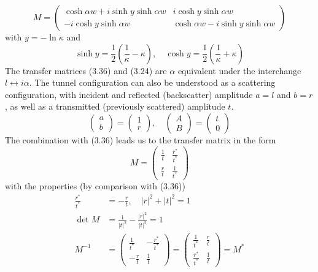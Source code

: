 \begin{equation}
M=\left(\begin{array}{cc}{\cosh \alpha w+i \sinh y \sinh \alpha w} & {i \cosh y \sinh \alpha w} \\ {-i \cosh y \sinh \alpha w} & {\cosh \alpha w-i \sinh y \sinh \alpha w}\end{array}\right)
\end{equation}
with $y = - \operatorname{ln} \kappa$ and
\begin{equation}
\sinh y=\frac{1}{2}\left(\frac{1}{\kappa}-\kappa\right), \quad \cosh y=\frac{1}{2}\left(\frac{1}{\kappa}+\kappa\right)
\end{equation}
The transfer matrices (3.36) and (3.24) are $\alpha$ equivalent under the interchange $l\longleftrightarrow i\alpha$. The tunnel configuration can also be understood as a scattering configuration, with incident and reflected (backscatter) amplitude $a = l$ and $b = r$, as well as a transmitted (previously scattered) amplitude $t$.
\begin{equation}
\left(\begin{array}{l}{a} \\ {b}\end{array}\right)=\left(\begin{array}{l}{1} \\ {r}\end{array}\right), \quad\left(\begin{array}{l}{A} \\ {B}\end{array}\right)=\left(\begin{array}{l}{t} \\ {0}\end{array}\right)
\end{equation}
The combination with (3.36) leads us to the transfer matrix in the form
\begin{equation}
M=\left(\begin{array}{cc}{\frac{1}{t}} & {\frac{r^{*}}{t^{*}}} \\ {\frac{r}{t}} & {\frac{1}{t^{*}}}\end{array}\right)
\end{equation}
with the properties (by comparison with (3.36))
\begin{equation}
\begin{aligned} \frac{r^{*}}{t^{*}} &=-\frac{r}{t}, \quad|r|^{2}+|t|^{2}=1 \\ \operatorname{det} M &=\frac{1}{|t|^{2}}-\frac{|r|^{2}}{|t|^{2}}=1 \\ M^{-1} &=\left(\begin{array}{cc}{\frac{1}{t^{*}}} & {-\frac{r^{*}}{t^{*}}} \\ {-\frac{r}{t}} & {\frac{1}{t}}\end{array}\right)=\left(\begin{array}{cc}{\frac{1}{t^{*}}} & {\frac{r}{t}} \\ {\frac{r^{*}}{t^{*}}} & {\frac{1}{t}}\end{array}\right)=M^{*} \end{aligned}
\end{equation}

